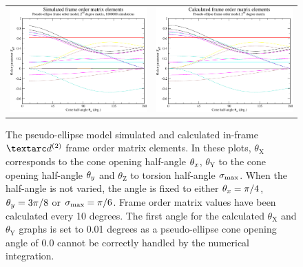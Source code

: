 \begin{figure}
\begin{tabular}{@{}cc@{}}
    \\[-5pt]
    \includegraphics[width=.5\textwidth]{images/frame_order_matrix/Sijkl_pseudo-ellipse_in_frame_theta_z_ens1000000.eps} &
    \includegraphics[width=.5\textwidth]{images/frame_order_matrix/Sijkl_pseudo-ellipse_in_frame_theta_z_calc.eps} \\
  \end{tabular}
  \caption[Pseudo-ellipse simulated and calculated in-frame Daeg$^{(2)}$ elements.]{
    The pseudo-ellipse model simulated and calculated in-frame $\FOtwo$ frame order matrix elements.
    In these plots, $\theta_\textrm{X}$ corresponds to the cone opening half-angle $\theta_x$, $\theta_\textrm{Y}$ to the cone opening half-angle $\theta_y$ and $\theta_\textrm{Z}$ to torsion half-angle $\sigma_\textrm{max}$.
    When the half-angle is not varied, the angle is fixed to either $\theta_x = \pi/4$, $\theta_y = 3\pi/8$ or $\sigma_\textrm{max} = \pi/6$.
    Frame order matrix values have been calculated every 10 degrees.
    The first angle for the calculated $\theta_\textrm{X}$ and $\theta_\textrm{Y}$ graphs is set to 0.01 degrees as a pseudo-ellipse cone opening angle of 0.0 cannot be correctly handled by the numerical integration.
  }
  \label{fig: simulated and calculated in-frame 2nd degree pseudo-ellipse frame order}
\end{figure}

